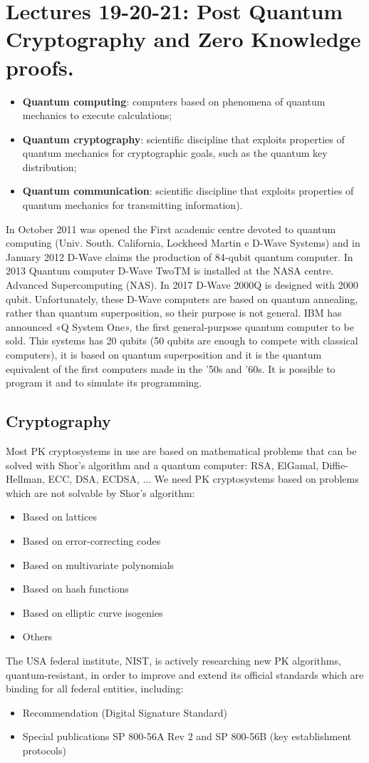 \documentclass[a4paper, 10pt, titlepage]{article}
\begin{document}
\section{Lectures 19-20-21: Post Quantum Cryptography and Zero Knowledge proofs.}
\begin{itemize}
\item \textbf{Quantum computing}: computers based on phenomena of quantum mechanics to execute calculations;
\item \textbf{Quantum cryptography}: scientific discipline that exploits properties of quantum mechanics for cryptographic goals, such as the quantum key distribution;
\item \textbf{Quantum communication}: scientific discipline that exploits properties of quantum mechanics for transmitting information).
\end{itemize}
In October 2011 was opened the First academic centre devoted to quantum computing (Univ. South. California, Lockheed Martin e D-Wave Systems) and in January 2012 D-Wave claims the production of 84-qubit
quantum computer. In 2013 Quantum computer D-Wave TwoTM is installed at the NASA centre. Advanced Supercomputing (NAS). In 2017 D-Wave 2000Q is designed with 2000 qubit. Unfortunately, these D-Wave computers are based on quantum annealing, rather than quantum superposition, so their purpose is not general.
IBM has announced «Q System One», the first general-purpose quantum
computer to be sold. This systems has 20 qubits (50 qubits are enough to compete with classical computers), it is based on quantum superposition and it is the quantum equivalent of the first computers made in the '50s and '60s. It is possible to program it and to simulate its programming. 
\subsection{Cryptography}
Most PK cryptosystems in use are based on mathematical problems that can be solved with Shor's algorithm and a quantum computer: RSA, ElGamal, Diffie-Hellman, ECC, DSA, ECDSA, ...
We need PK cryptosystems based on problems which are not solvable by Shor's algorithm:
\begin{itemize}
\item Based on lattices
\item Based on error-correcting codes
\item Based on multivariate polynomials
\item Based on hash functions
\item Based on elliptic curve isogenies
\item Others
\end{itemize}
The USA federal institute, NIST, is actively researching new PK algorithms, quantum-resistant, in order to improve and extend its official standards which are binding for all federal entities, including:
\begin{itemize}
\item Recommendation (Digital Signature Standard)
\item Special publications SP 800-56A Rev 2 and SP 800-56B (key establishment protocols)
\end{itemize}
\end{document}
